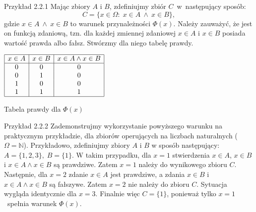 \documentclass{SGGW-thesis}
\begin{document}
\begin{paragraph}{Przykład 2.2.1\label{ex:2.2.1}}
    Mając zbiory $A$ i $B$, zdefiniujmy zbiór $C$~w~następujący sposób:
    \begin{equation}
        C = \{x \in \Omega:\; x \in A \:\wedge\: x \in B\},
    \end{equation}
    gdzie $x \in A \:\wedge\: x \in B$ to warunek przynależności $\Phi\left( x \right)$. Należy zauważyć, że jest on funkcją zdaniową, tzn. dla każdej zmiennej zdaniowej $x \in A$ i $x \in B$ posiada wartość prawda albo fałsz. Stwórzmy dla niego tabelę prawdy.

    \begin{table}[h]
        \centering
        $\begin{array}{|c|c|c|}
            \hline
            x \in A & x \in B & x \in A \wedge x \in B \\
            \hline
            0 & 0 & 0 \\
            0 & 1 & 0 \\
            1 & 0 & 0 \\
            1 & 1 & 1 \\
            \hline
        \end{array}$
        \caption{Tabela prawdy dla $\Phi\left( x \right)$}
    \end{table}
\end{paragraph}

\begin{paragraph}{Przykład 2.2.2\label{ex:2.2.2}}
    Zademonstrujmy wykorzystanie powyższego warunku na praktycznym przykładzie, dla zbiorów operujących na liczbach naturalnych ($\Omega = \mathbb{N}$). Przykładowo, zdefiniujmy zbiory $A$ i $B$ w sposób następujący: $A = \{ 1, 2, 3 \},\; B = \{ 1 \}$. W takim przypadku, dla $x = 1$ stwierdzenia $x \in A $, $ x \in B$ i $ x \in A \wedge x \in B$ są prawdziwe. Zatem $x = 1$ należy do wynikowego zbioru $C$. Następnie, dla $x = 2$ zdanie $x \in A$ jest prawdziwe, a zdania $ x \in B$ i $ x \in A \wedge x \in B$ są fałszywe. Zatem $x = 2$ nie należy do zbioru $C$. Sytuacja wygląda identycznie dla $x = 3$. Finalnie więc $C = \{ 1 \}$, ponieważ tylko $x = 1$~spełnia warunek $\Phi(x)$.
\end{paragraph}
\end{document}

